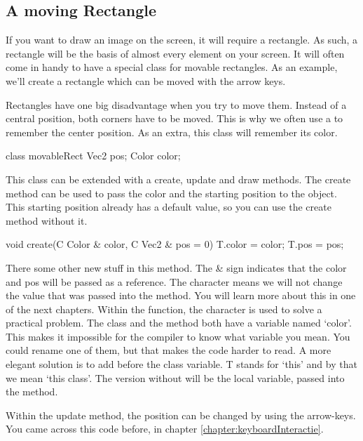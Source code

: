 \subsection{A moving Rectangle}
If you want to draw an image on the screen, it will require a rectangle. As such, a rectangle will be the basis of almost every element on your screen. It will often come in handy to have a special class for movable rectangles. As an example, we'll create a rectangle which can be moved with the arrow keys.

Rectangles have one big disadvantage when you try to move them. Instead of a central position, both corners have to be moved. This is why we often use a  to remember the center position. As an extra, this class will remember its color.


\begin{code}
class movableRect {
  	Vec2 pos;
	Color color;
}
\end{code}

This class can be extended with a create, update and draw methods. The create method can be used to pass the color and the starting position to the object. This starting position already has a default value, so you can use the create method without it.

\begin{code}
void create(C Color & color, C Vec2 & pos = 0) {
  	T.color = color;
	T.pos = pos;
}
\end{code}

\begin{note}
There some other new stuff in this method. The \& sign indicates that the color and pos will be passed as a reference. The character  means we will not change the value that was passed into the method. You will learn more about this in one of the next chapters. Within the function, the character  is used to solve a practical problem. The class and the method both have a variable named `color'. This makes it impossible for the compiler to know what variable you mean. You could rename one of them, but that makes the code harder to read. A more elegant solution is to add  before the class variable. T stands for `this' and by that we mean `this class'. The version without  will be the local variable, passed into the method.
\end{note}

Within the update method, the position can be changed by using the arrow-keys. You came across this code before, in chapter \ref{chapter:keyboardInteractie}.

